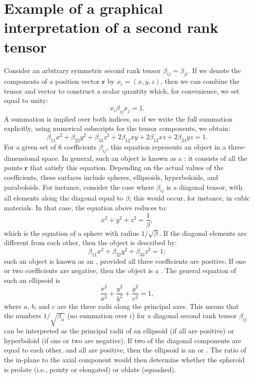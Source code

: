 \section{Example of a graphical interpretation of a second rank tensor}

Consider an arbitrary symmetric second rank tensor $\beta_{ij}=\beta_{ji}$.  If we denote the components of a position vector $\mathbf{r}$ by $x_i=(x,y,z)$, then we can combine the tensor and vector to construct a scalar quantity which, for convenience, we set equal to unity:
\[
	x_i\beta_{ij}x_j = 1.
\]
A summation is implied over both indices, so if we write the full summation explicitly, using numerical subscripts for the tensor components, we obtain:
\[
	\beta_{11}x^2+\beta_{22}y^2+\beta_{33}z^2 + 2\beta_{12}xy+2\beta_{13}xz+2\beta_{23}yz=1.
\]
For a given set of $6$ coefficients $\beta_{ij}$, this equation represents an object in a three-dimensional space.  In general, such an object is known as a ; it consists of all the points $\mathbf{r}$  that satisfy this equation.  Depending on the actual values of the coefficients, these surfaces include spheres, ellipsoids, hyperboloids, and paraboloids.  For instance, consider the case where $\beta_{ij}$ is a diagonal tensor, with all elements along the diagonal equal to $\beta$; this would occur, for instance, in cubic materials.  In that case, the equation above reduces to:
\[
	x^2 + y^2+z^2 = \frac{1}{\beta},
\]
which is the equation of a sphere with radius $1/\sqrt{\beta}$.  If the diagonal elements are different from each other, then the object is described by:
\[
	\beta_{11}x^2+\beta_{22}y^2+\beta_{33}z^2=1;
\]
such an object is known as an , provided all three coefficients are positive.  If one or two coefficients are negative, then the object is a .  The general equation of such an ellipsoid is
\[
	\frac{x^2}{a^2} + \frac{y^2}{b^2} + \frac{y^2}{c^2} = 1,
\]
where $a$, $b$, and $c$ are the three radii along the principal axes.  This means that the numbers $1/\sqrt{\beta_{ii}}$ (no summation over $i$) for a  diagonal second rank tensor $\beta_{ij}$ can be interpreted as the principal radii of an ellipsoid (if all are positive) or hyperboloid (if one or two are negative).  If two of the diagonal components are equal to each other, and all are positive, then the ellipsoid is an  or . The ratio of the in-plane to the axial component would then determine whether the spheroid is prolate (i.e., pointy or elongated) or oblate (squashed).

